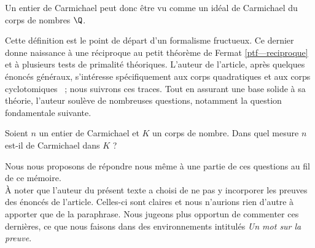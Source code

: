 \begin{remarque}
	Un entier de Carmichael peut donc être vu comme un idéal de Carmichael du corps de nombres $\Q$.
\end{remarque}

Cette définition est le point de départ d'un formalisme fructueux. Ce dernier donne naissance à une réciproque au petit théorème de Fermat \ref{ptf—reciproque} et à plusieurs tests de primalité théoriques. L'auteur de l'article, après quelques énoncés généraux, s'intéresse spécifiquement aux corps quadratiques et aux corps cyclotomiques ~; nous suivrons ces traces. Tout en assurant une base solide à sa théorie, l'auteur soulève de nombreuses questions, notamment la question fondamentale suivante.

\begin{question}\label{question-centrale}Soient $n$ un entier de Carmichael et $K$ un corps de nombre. Dans quel mesure $n$ est-il de Carmichael dans $K$ ?
\end{question}

	Nous nous proposons de répondre nous même à une partie de ces questions au fil de ce mémoire. \\

À noter que l'auteur du présent texte a choisi de ne pas y incorporer les preuves des énoncés de l'article. Celles-ci sont claires et nous n'aurions rien d'autre à apporter que de la paraphrase. Nous jugeons plus opportun de commenter ces dernières, ce que nous faisons dans des environnements intitulés \textit{Un mot sur la preuve}.
